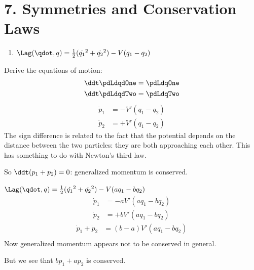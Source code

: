 \section{7.  Symmetries and Conservation Laws}

\begin{enumerate}
\item $\Lag(\qdot, q) = \frac{1}{2}(\dot{q_1}^2 + \dot{q_2}^2) - V(q_1 - q_2)$
\end{enumerate}
Derive the equations of motion:
\begin{align*}
  \ddt \pdLdqdOne &= \pdLdqOne \\
  \ddt \pdLdqdTwo &= \pdLdqTwo \\
\end{align*}
\begin{align*}
  \dot{p}_1        &= -V'(q_1 - q_2) \\
  \dot{p}_2        &= +V'(q_1 - q_2)
\end{align*}
The sign difference is related to the fact that the potential depends on the distance between the two
particles: they are both approaching each other. This has something to do with Newton's third law.

So $\ddt(p_1 + p_2) = 0$: generalized momentum is conserved.

\item $\Lag(\qdot, q) = \frac{1}{2}(\dot{q_1}^2 + \dot{q_2}^2) - V(aq_1 - bq_2)$
\begin{align*}
  \dot{p}_1        &= -aV'(aq_1 - bq_2) \\
  \dot{p}_2        &= +bV'(aq_1 - bq_2)
\end{align*}
\begin{align*}
  \dot{p}_1 + \dot{p}_2 &= (b-a)V'(aq_1 - bq_2) \\
\end{align*}
Now generalized momentum appears not to be conserved in general.

But we see that $bp_1 + ap_2$ is conserved.

